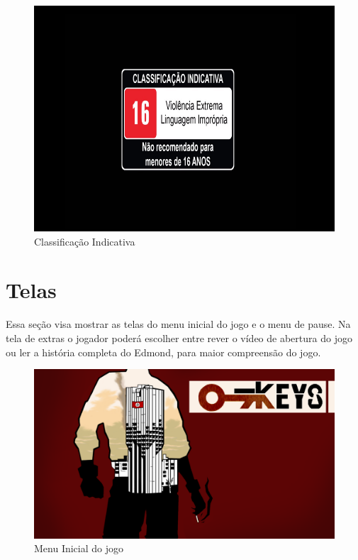 \begin{figure}[!h]
    \centering
    \caption{Classificação Indicativa}
    \includegraphics[keepaspectratio=true,scale=0.30]{images/classificacao_indicativa.png}
\end{figure}

\section{Telas}
Essa seção visa mostrar as telas do menu inicial do jogo e o menu de pause. Na tela de extras o jogador poderá escolher entre rever o vídeo de abertura do jogo ou ler a história completa do Edmond, para maior compreensão do jogo.

\begin{figure}[!h]
    \label{menu}
    \centering
    \caption{Menu Inicial do jogo}
    \includegraphics[keepaspectratio=true,scale=0.35]{images/menuInicial.png}
\end{figure}

